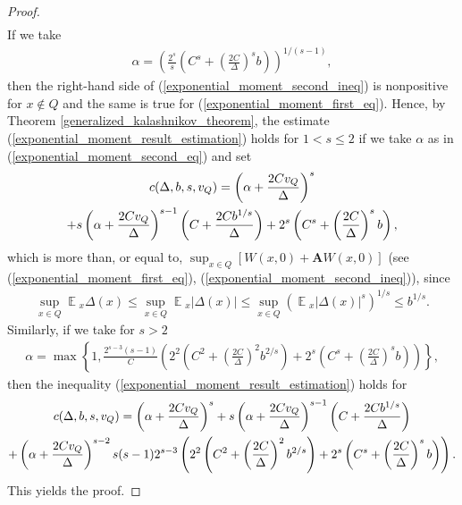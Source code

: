 \documentclass[10pt, reqno]{amsart}
\theoremstyle{definition}
\newcommand{\aasVar}{Q} %
\newcommand{\wtfVar}{W} %
\newcommand{\atoVar}{\mathbf{A}} %
\newcommand{\absolute}[1]{\left|#1\right|}
\DeclareMathOperator*{\E}{\mathbb{E}}
\begin{document}
\begin{proof}
\begin{gather}
		\label{exponential_moment_second_ineq}
		\end{gather}
		If we take
		\begin{gather}
		\alpha = \left(\frac{2^{s}}{s}\left(C^{s} + \left(\frac{2C}{\Delta}\right)^{s}b\right)\right)^{1 / (s-1)},
		\label{exponential_moment_second_eq}
		\end{gather}
		then the right-hand side of (\ref{exponential_moment_second_ineq}) is nonpositive for $x \notin \aasVar$ and the same is true for (\ref{exponential_moment_first_eq}). Hence, by Theorem \ref{generalized_kalashnikov_theorem}, the estimate (\ref{exponential_moment_result_estimation}) holds for $1 < s \leq 2$ if we take $\alpha$ as in (\ref{exponential_moment_second_eq}) and set
		\begin{gather}
		c(\Delta, b, s, v_{\aasVar}) = \left(\alpha + \frac{2Cv_{\aasVar}}{\Delta}\right)^{s} \notag\\ + s\left(\alpha + \frac{2Cv_{\aasVar}}{\Delta}\right)^{s-1}\left(C + \frac{2Cb^{1/s}}{\Delta}\right) + 2^{s}\left(C^{s} + \left(\frac{2C}{\Delta}\right)^{s}b\right),
		\label{exponential_moment_third_eq}
		\end{gather}
		which is more than, or equal to, $\sup_{x \in \aasVar}\left[\wtfVar(x, 0) + \atoVar\wtfVar(x, 0)\right]$ (see (\ref{exponential_moment_first_eq}), (\ref{exponential_moment_second_ineq})), since
		\begin{gather*}
		\sup_{x \in \aasVar}\E{}_{x}\Delta(x) \leq \sup_{x \in \aasVar}\E{}_{x}\absolute{\Delta(x)} \leq \sup_{x \in \aasVar}(\E{}_{x}\absolute{\Delta(x)}^{s})^{1/s} \leq b^{1/s}.
		\end{gather*}
		Similarly, if we take for $s > 2$
		\begin{gather*}
		\alpha = \max\left\{1, \frac{2^{s-3}(s-1)}{C}\left(2^{2}\left(C^{2} + \left(\frac{2C}{\Delta}\right)^{2}b^{2/s}\right) + 2^{s}\left(C^{s} + \left(\frac{2C}{\Delta}\right)^{s}b\right)\right)\right\},
		\label{exponential_moment_alpha}
		\end{gather*}
		then the inequality (\ref{exponential_moment_result_estimation}) holds for
		\begin{gather}
		c(\Delta, b, s, v_{\aasVar}) = \left(\alpha + \frac{2Cv_{\aasVar}}{\Delta}\right)^{s} + s\left(\alpha + \frac{2Cv_{\aasVar}}{\Delta}\right)^{s-1}\left(C + \frac{2Cb^{1/s}}{\Delta}\right) \notag\\ + \left(\alpha + \frac{2Cv_{\aasVar}}{\Delta}\right)^{s-2}s(s-1)2^{s-3}\left(2^{2}\left(C^{2} + \left(\frac{2C}{\Delta}\right)^{2}b^{2/s}\right) + 2^{s}\left(C^{s} + \left(\frac{2C}{\Delta}\right)^{s}b\right)\right).
		\label{exponential_moment_c}
		\end{gather}
		This yields the proof.
	\end{proof}
	
\end{document}

